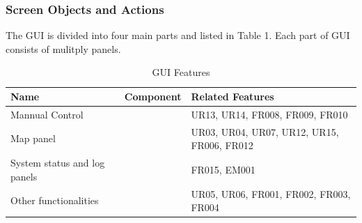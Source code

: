 \subsubsection{Screen Objects and Actions}
The GUI is divided into four main parts and listed in Table 1. Each part of GUI consists of mulitply panels.

\begin{table}[]
	\centering
	\caption{GUI Features}
	\label{GUI Features}
	\begin{tabular}{|l|l|l|}
		\hline
		Name             & Component & Related Features                       \\ \hline
		Mannual Control &           & UR13, UR14, FR008, FR009, FR010        \\ \hline
		Map panel         &           & UR03, UR04, UR07, UR12, UR15, FR006, FR012 \\ \hline
		System status and log panels    &           & FR015, EM001                               \\ \hline
		Other functionalities       &           &  UR05, UR06, FR001, FR002, FR003, FR004      \\ \hline
	\end{tabular}
\end{table}

